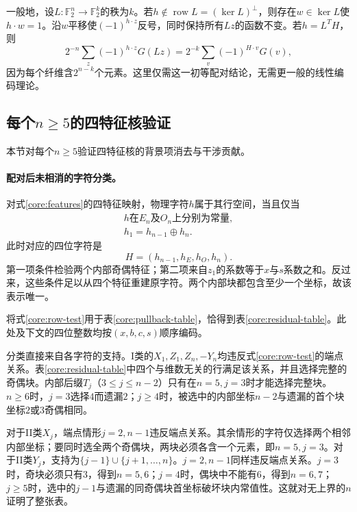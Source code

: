一般地，设$L:\mathbb F_2^n\to\mathbb F_2^k$的秩为$k$。若$h\notin\operatorname{row}L=(\ker L)^\perp$，则存在$w\in\ker L$使$h\cdot w=1$。沿$w$平移使$(-1)^{h\cdot z}$反号，同时保持所有$Lz$的函数不变。若$h=L^TH$，则
\begin{equation}
 2^{-n}\sum_z(-1)^{h\cdot z}G(Lz)
 =2^{-k}\sum_v(-1)^{H\cdot v}G(v),
 \label{core:compression}
\end{equation}
因为每个纤维含$2^{n-k}$个元素。这里仅需这一初等配对结论，无需更一般的线性编码理论。

\subsection{每个\texorpdfstring{$n\ge5$}{n >= 5}的四特征核验证}
\label{core:alln-classification}

本节对每个$n\ge5$验证四特征核的背景项消去与干涉贡献。

\paragraph{配对后未相消的字符分类。}
对式\eqref{core:features}的四特征映射，物理字符$h$属于其行空间，当且仅当
\begin{equation}
 \begin{gathered}
 h\text{在}E_n\text{及}O_n\text{上分别为常量},\\
 h_1=h_{n-1}\oplus h_n.
 \end{gathered}
 \label{core:row-test}
\end{equation}
此时对应的四位字符是
\[
 H=(h_{n-1},h_E,h_O,h_n).
\]
第一项条件检验两个内部奇偶特征；第二项来自$z_1$的系数等于$x$与$s$系数之和。反过来，这些条件足以从四个特征重建原字符。两个内部块都包含至少一个坐标，故该表示唯一。

将式\eqref{core:row-test}用于表\ref{core:pullback-table}，恰得到表\ref{core:residual-table}。此处及下文的四位整数均按$(x,b,c,s)$顺序编码。



分类直接来自各字符的支持。I类的$X_1,Z_1,Z_n,-Y_n$均违反式\eqref{core:row-test}的端点关系。表\ref{core:residual-table}中四个与维数无关的行满足该关系，并且选择完整的奇偶块。内部后缀$T_j$（$3\le j\le n-2$）只有在$n=5,j=3$时才能选择完整块。$n\ge6$时，$j=3$选择$4$而遗漏$2$；$j\ge4$时，被选中的内部坐标$n-2$与遗漏的首个块坐标$2$或$3$奇偶相同。

对于II类$X_j$，端点情形$j=2,n-1$违反端点关系。其余情形的字符仅选择两个相邻内部坐标；要同时选全两个奇偶块，两块必须各含一个元素，即$n=5,j=3$。对于II类$Y_j$，支持为$\{j-1\}\cup\{j+1,\ldots,n\}$。$j=2,n-1$同样违反端点关系。$j=3$时，奇块必须只有$3$，得到$n=5,6$；$j=4$时，偶块中不能有$6$，得到$n=6,7$；$j\ge5$时，选中的$j-1$与遗漏的同奇偶块首坐标破坏块内常值性。这就对无上界的$n$证明了整张表。


